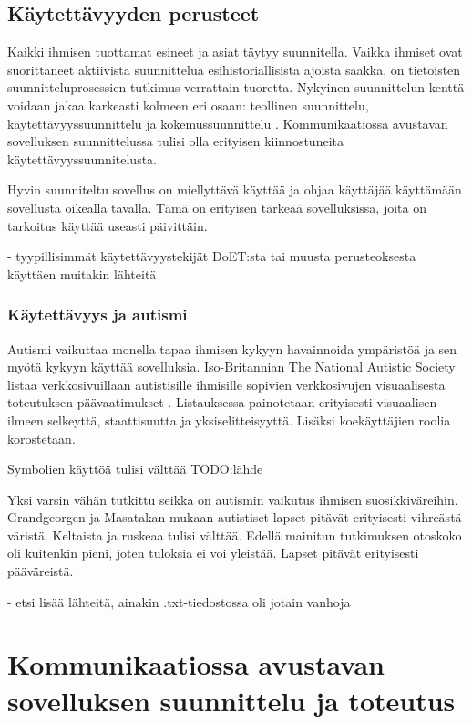 \documentclass[utf8]{gradu3}
\begin{document}
\section{Käytettävyyden perusteet}

Kaikki ihmisen tuottamat esineet ja asiat täytyy suunnitella. Vaikka ihmiset ovat suorittaneet aktiivista suunnittelua esihistoriallisista ajoista saakka, on tietoisten suunnitteluprosessien tutkimus verrattain tuoretta. Nykyinen suunnittelun kenttä voidaan jakaa karkeasti kolmeen eri osaan: teollinen suunnittelu, käytettävyyssuunnittelu ja kokemussuunnittelu \parencite[]{norman-doet}. Kommunikaatiossa avustavan sovelluksen suunnittelussa tulisi olla erityisen kiinnostuneita käytettävyyssuunnitelusta.

Hyvin suunniteltu sovellus on miellyttävä käyttää ja ohjaa käyttäjää käyttämään sovellusta oikealla tavalla. Tämä on erityisen tärkeää sovelluksissa, joita on tarkoitus käyttää useasti päivittäin.

- tyypillisimmät käytettävyystekijät DoET:sta tai muusta perusteoksesta käyttäen muitakin lähteitä

\subsection{Käytettävyys ja autismi}

Autismi vaikuttaa monella tapaa ihmisen kykyyn havainnoida ympäristöä ja sen myötä kykyyn käyttää sovelluksia. Iso-Britannian The National Autistic Society listaa verkkosivuillaan autistisille ihmisille sopivien verkkosivujen visuaalisesta toteutuksen päävaatimukset \parencite[]{autism-friendly-websites}. Listauksessa painotetaan erityisesti visuaalisen ilmeen selkeyttä, staattisuutta ja yksiselitteisyyttä. Lisäksi koekäyttäjien roolia korostetaan.

Symbolien käyttöä tulisi välttää TODO:lähde

Yksi varsin vähän tutkittu seikka on autismin vaikutus ihmisen suosikkiväreihin. Grandgeorgen ja Masatakan \parencite[]{color-preference-autism} mukaan autistiset lapset pitävät erityisesti vihreästä väristä. Keltaista ja ruskeaa tulisi välttää. Edellä mainitun tutkimuksen otoskoko oli kuitenkin pieni, joten tuloksia ei voi yleistää. Lapset pitävät erityisesti pääväreistä.

- etsi lisää lähteitä, ainakin .txt-tiedostossa oli jotain vanhoja

\chapter{Kommunikaatiossa avustavan sovelluksen suunnittelu ja toteutus}
\end{document}
